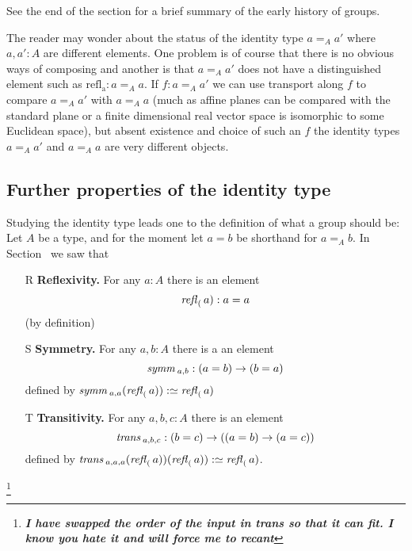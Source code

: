 See the end of the section  for a brief summary of the early history of groups.  
\begin{remark}
  The reader may wonder about the status of the identity type $a=_Aa'$ where $a,a':A$ are different elements.  One problem is of course that there is no obvious ways of composing and another is that $a=_Aa'$ does not have a distinguished element such as $\mathrm{refl{}_a}:a=_Aa$.
If $f:a=_Aa'$ we can use transport along $f$ to compare $a=_Aa'$ with $a=_Aa$ (much as affine planes can be compared with the standard plane or a finite dimensional real vector space is isomorphic to some Euclidean space), but absent existence and choice of such an $f$ the identity types $a=_Aa'$ and $a=_Aa$ are very different objects.
\end{remark}

\subsection{Further properties of the identity type}
Studying the identity type leads one to the definition of what a group should be:
Let $A$ be a type, and for the moment let $a=b$ be shorthand for $a=_Ab$.  In Section~ we saw that
\begin{enumerate}
\item[R] {\bf Reflexivity.} For any $a:A$ there is an element 
$$\mathop{{\it refl}_{(}}a):a=a$$ (by definition)
\item[S] {\bf Symmetry.} For any $a,b:A$ there is a an element $$\mathop{\mathit{symm}}{}_{a,b}:(a=b)\to (b=a)$$ defined by $\mathop{\mathit{symm}}{}_{a,a}(\mathop{{\it refl}_{(}}a)):\simeq\mathop{{\it refl}_{(}}a)$
\item[T] {\bf Transitivity.} For any $a,b,c:A$ there is an element $$\mathop{\mathit{trans}}{}_{a,b,c}:(b=c)\to((a=b)\to(a=c))$$ defined by $\mathop{\mathit{trans}}{}_{a,a,a}(\mathop{{\it refl}_{(}}a))(\mathop{{\it refl}_{(}}a)):\simeq \mathop{{\it refl}_{(}}a)$.
\end{enumerate}
\footnote{\em\bf I have swapped the order of the input in trans so that it can fit.  I know you hate it and will force me to recant}

